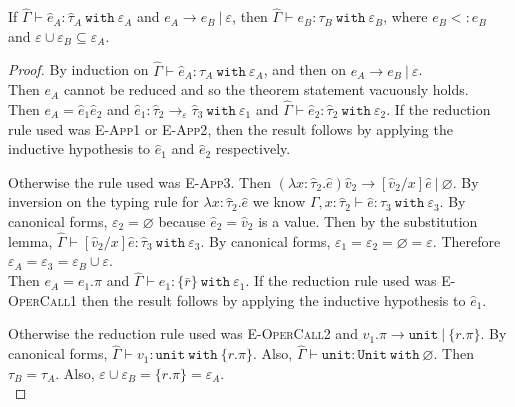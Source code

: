 \documentclass{llncs}
\newcommand{\keywadj}[1]{\mathtt{#1}}
\newcommand{\keyw}[1]{\keywadj{#1}~}
\newcommand{\kw}[1]{\keyw{ #1 }}
\newcommand{\kwa}[1]{\keywadj{ #1 }}
\begin{document}
\begin{theorem}[Preservation]
If $\hat \Gamma \vdash \hat e_A: \hat \tau_A~\kw{with} \varepsilon_A$ and $e_A \longrightarrow e_B~|~\varepsilon$, then $\hat \Gamma \vdash e_B: \tau_B~\kw{with} \varepsilon_B$, where $e_B <: e_B$ and $\varepsilon \cup \varepsilon_B \subseteq \varepsilon_A$.
\end{theorem}

\begin{proof}
By induction on $\hat \Gamma \vdash \hat e_A: \tau_A~\kw{with }\varepsilon_A$, and then on $e_A \longrightarrow e_B~|~\varepsilon$. \\

\noindent
{} Then $e_A$ cannot be reduced and so the theorem statement vacuously holds. \\

\noindent
{}
Then $e_A = \hat e_1 \hat e_2$ and $\hat e_1: \hat \tau_2 \rightarrow_{\varepsilon} \hat \tau_3~\kw{with} \varepsilon_1$ and $\hat \Gamma \vdash \hat e_2: \hat \tau_2~\kw{with} \varepsilon_2$. If the reduction rule used was \textsc{E-App1} or \textsc{E-App2}, then the result follows by applying the inductive hypothesis to $\hat e_1$ and $\hat e_2$ respectively.

Otherwise the rule used was \textsc{E-App3}. Then $(\lambda x: \hat \tau_2.\hat e)\hat v_2 \longrightarrow [\hat v_2/x]\hat e~|~\varnothing$. By inversion on the typing rule for $\lambda x: \hat \tau_2.\hat e$ we know $\Gamma, x: \hat \tau_2 \vdash \hat e: \hat \tau_3~\kw{with} \varepsilon_3$. By canonical forms, $\varepsilon_2 = \varnothing$ because $\hat e_2 = \hat v_2$ is a value. Then by the substitution lemma, $\hat \Gamma \vdash [\hat v_2/x]\hat e : \hat \tau_3~\kw{with} \varepsilon_3$. By canonical forms, $\varepsilon_1 = \varepsilon_2 = \varnothing = \varepsilon$. Therefore $\varepsilon_A = \varepsilon_3 = \varepsilon_B \cup \varepsilon$.\\

\noindent
{}
Then $e_A = e_1.\pi$ and $\hat \Gamma \vdash e_1 : \{ \bar r \}~\kw{with} \varepsilon_1$. If the reduction rule used was \textsc{E-OperCall1} then the result follows by applying the inductive hypothesis to $\hat e_1$.

Otherwise the reduction rule used was \textsc{E-OperCall2} and $v_1.\pi \longrightarrow \kwa{unit}~|~\{ r.\pi \}$. By canonical forms, $\hat \Gamma \vdash v_1: \kwa{unit}~\kw{with} \{ r.\pi \}$. Also, $\hat \Gamma \vdash \kwa{unit}: \kwa{Unit}~\kw{with} \varnothing$. Then $\tau_B = \tau_A$. Also, $\varepsilon \cup \varepsilon_B = \{ r.\pi \} = \varepsilon_A$.\\


\end{proof}
\end{document}
